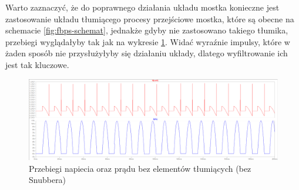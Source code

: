 \documentclass[11pt]{article}
\begin{document}
Warto zaznaczyć, że do poprawnego działania układu mostka konieczne jest zastosowanie układu tłumiącego procesy przejściowe mostka, które są obecne na schemacie \ref{fig:fbps-schemat}, jednakże gdyby nie zastosowano takiego tłumika, przebiegi wyglądałyby tak jak na wykresie \ref{fig:aun1_fbp-90}. Widać wyraźnie impulsy, które w żaden sposób nie przysłużyłyby się działaniu układy, dlatego wyfiltrowanie ich jest tak kluczowe. 
\begin{figure}[H]
    \centering
    \includegraphics[width=1\linewidth]{aun1_fbp-90.png}
    \caption{Przebiegi napiecia oraz prądu bez elementów tłumiących (bez Snubbera)}
    \label{fig:aun1_fbp-90}
\end{figure}
\end{document}
